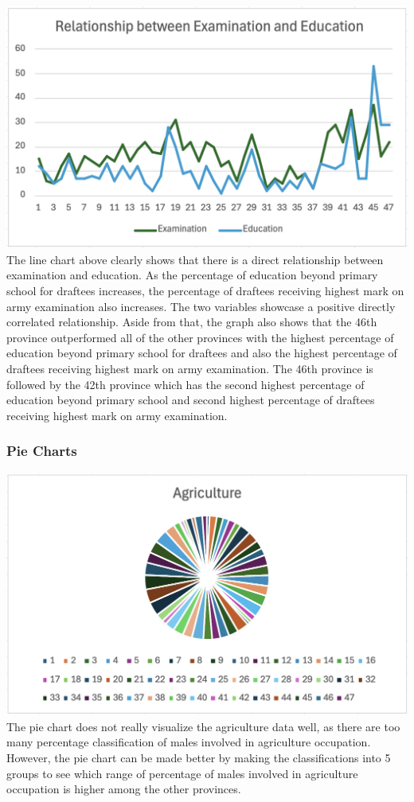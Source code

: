 \documentclass[
  letterpaper,
  DIV=11,
  numbers=noendperiod]{scrreprt}
\begin{document}
\includegraphics{./Excel_1_Unit/Week1_Janice/Week 1/Week 1 Wednesday/Swiss_linechart.png}
The line chart above clearly shows that there is a direct relationship
between examination and education. As the percentage of education beyond
primary school for draftees increases, the percentage of draftees
receiving highest mark on army examination also increases. The two
variables showcase a positive directly correlated relationship. Aside
from that, the graph also shows that the 46th province outperformed all
of the other provinces with the highest percentage of education beyond
primary school for draftees and also the highest percentage of draftees
receiving highest mark on army examination. The 46th province is
followed by the 42th province which has the second highest percentage of
education beyond primary school and second highest percentage of
draftees receiving highest mark on army examination.

\subsubsection{Pie Charts}\label{pie-charts}

\includegraphics{./Excel_1_Unit/Week1_Janice/Week 1/Week 1 Wednesday/Swiss_piechart.png}
The pie chart does not really visualize the agriculture data well, as
there are too many percentage classification of males involved in
agriculture occupation. However, the pie chart can be made better by
making the classifications into 5 groups to see which range of
percentage of males involved in agriculture occupation is higher among
the other provinces.
\end{document}
